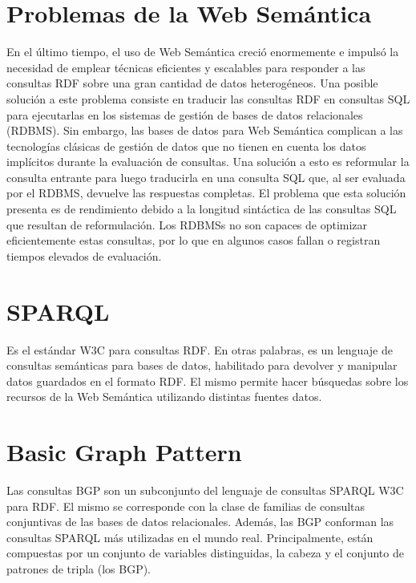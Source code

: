 \documentclass[10pt,a4paper]{article}
\begin{document}
\section{Problemas de la Web Semántica}
En el último tiempo, el uso de Web Semántica creció enormemente e impulsó la necesidad de emplear técnicas eficientes y escalables para responder a las consultas RDF sobre una gran cantidad de datos heterogéneos. Una posible solución a este problema consiste en traducir las consultas RDF en consultas SQL para ejecutarlas en los sistemas de gestión de bases de datos relacionales (RDBMS). Sin embargo, las bases de datos para Web Semántica complican a las tecnologías clásicas de gestión de datos que no tienen en cuenta los datos implícitos durante la evaluación de consultas. Una solución a esto es reformular la consulta entrante para luego traducirla en una consulta SQL que, al ser evaluada por el RDBMS, devuelve las respuestas completas. El problema que esta solución presenta es de rendimiento debido a la longitud sintáctica de las consultas SQL que resultan de reformulación. Los RDBMSs no son capaces de optimizar eficientemente estas consultas, por lo que en algunos casos fallan o registran tiempos elevados de evaluación.

\section{SPARQL}
Es el estándar W3C para consultas RDF. En otras palabras, es un lenguaje de consultas semánticas para bases de datos, habilitado para devolver y manipular datos guardados en el formato RDF. El mismo permite hacer búsquedas sobre los recursos de la Web Semántica utilizando distintas fuentes datos.

\section{Basic Graph Pattern}
Las consultas BGP son un subconjunto del lenguaje de consultas SPARQL W3C para RDF. El mismo se corresponde con la clase de familias de consultas conjuntivas de las bases de datos relacionales. Además, las BGP conforman las consultas SPARQL más utilizadas en el mundo real.
Principalmente, están compuestas por un conjunto de variables distinguidas, la cabeza y el conjunto de patrones de tripla (los BGP).
\end{document}
